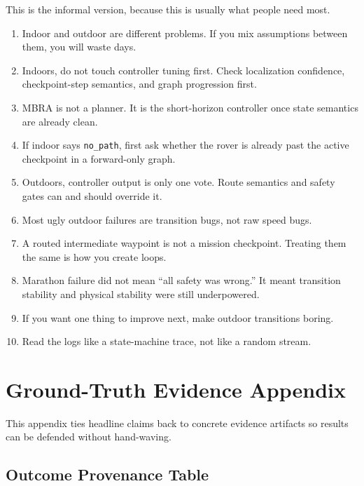 \documentclass[11pt]{article}
\begin{document}
This is the informal version, because this is usually what people need most.

\begin{enumerate}[nosep]
  \item Indoor and outdoor are different problems. If you mix assumptions between
  them, you will waste days.
  \item Indoors, do not touch controller tuning first. Check localization confidence,
  checkpoint-step semantics, and graph progression first.
  \item MBRA is not a planner. It is the short-horizon controller once state
  semantics are already clean.
  \item If indoor says \texttt{no\_path}, first ask whether the rover is already past
  the active checkpoint in a forward-only graph.
  \item Outdoors, controller output is only one vote. Route semantics and safety
  gates can and should override it.
  \item Most ugly outdoor failures are transition bugs, not raw speed bugs.
  \item A routed intermediate waypoint is not a mission checkpoint. Treating them the
  same is how you create loops.
  \item Marathon failure did not mean ``all safety was wrong.'' It meant transition
  stability and physical stability were still underpowered.
  \item If you want one thing to improve next, make outdoor transitions boring.
  \item Read the logs like a state-machine trace, not like a random stream.
\end{enumerate}

\section{Ground-Truth Evidence Appendix}

This appendix ties headline claims back to concrete evidence artifacts so results
can be defended without hand-waving.

\subsection{Outcome Provenance Table}
\end{document}
